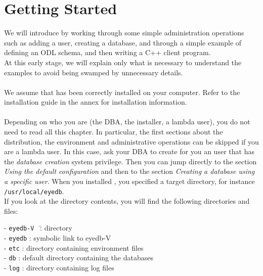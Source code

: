 

\newcommand{\mantitle}{\textsc{Getting Started}}


\tableofcontents

\newcommand{\EYEDBARCH}{\emph{eyedbtop}/\texttt{eyedb-V\eyedbversion}/\emph{archdir}}

\chapter*{Getting Started}

We will introduce \eyedb by working through some simple administration
operations such as adding a user, creating a database, and through
a simple example of defining an ODL schema, and then writing a C++
client program.
\\
At this early stage, we will explain only what is necessary to understand
the examples to avoid being swamped by unnecessary details.
\\
\\
We assume that \eyedb has been correctly installed on your
computer.
Refer to the installation guide in the annex for installation information.
\\
\\
Depending on who you are (the DBA, the installer, a lambda user), you do not need
to read all this chapter. In particular, the first sections about the
distribution, the environment and administrative operations 
can be skipped if you are a lambda user. In this case, ask your DBA to create
for you an \eyedb user that has the \emph{database creation} system privilege. 
Then you can jump directly to the section
\emph{Using the default configuration} and then to the section
\emph{Creating a database using a specific user}.
When you installed \eyedbX, you specified a target directory, for instance
\texttt{/usr/local/eyedb}.
\\
If you look at the directory contents, you will find the following directories
and files:
\begin{tabbing}
- \texttt{eyedb-V\eyedbversion}\mbox{ } \= : directory \\
- \texttt{eyedb} \> : symbolic link to eyedb-V\eyedbversion \\
- \texttt{etc} \> : directory containing environment files \\
- \texttt{db} \> : default directory containing the databases \\
- \texttt{log} \> : directory containing log files
\end{tabbing}
